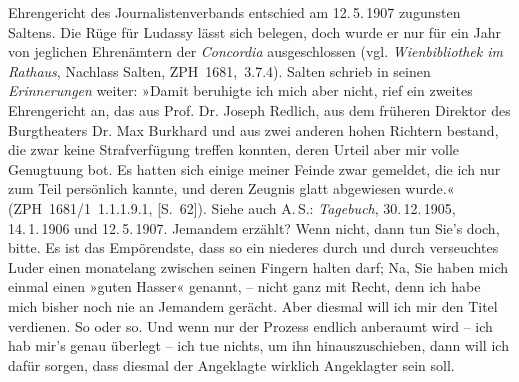 {{{                  Ehrengericht des Journalistenverbands entschied am 12. 5. 1907 zugunsten Saltens. Die Rüge für Ludassy lässt sich belegen, doch wurde er nur für ein Jahr von jeglichen
                  Ehrenämtern der \emph{Concordia} ausgeschlossen
                     (vgl. \emph{Wienbibliothek im Rathaus}, Nachlass Salten, ZPH 1681, 3.7.4). Salten schrieb in seinen \emph{Erinnerungen} weiter: »Damit beruhigte ich mich
                     aber nicht, rief ein zweites Ehrengericht an, das aus Prof. Dr. Joseph Redlich, aus dem früheren Direktor
                     des Burgtheaters Dr. Max Burkhard und aus zwei anderen hohen Richtern
                     bestand, die zwar keine Strafverfügung treffen konnten, deren Urteil aber mir
                     volle Genugtuung bot. Es hatten sich einige meiner Feinde zwar gemeldet, die
                     ich nur zum Teil persönlich kannte, und deren Zeugnis glatt abgewiesen
                     wurde.« (ZPH 1681/1 1.1.1.9.1, [S. 62]). Siehe auch A. S.: \emph{Tagebuch}, 30. 12. 1905, 14. 1. 1906 und 12. 5. 1907.}}}\label{K_L03415-6}
               Jemandem erzählt? Wenn nicht, dann tun Sie’s doch, bitte. Es ist das Empörendste,
               dass so ein niederes {\pb}durch und
               durch verseuchtes Luder einen monatelang zwischen seinen Fingern halten darf; Na, Sie
               haben mich einmal einen »guten Hasser« genannt, – nicht ganz mit Recht, denn ich habe
               mich bisher noch nie an Jemandem gerächt. Aber diesmal will ich mir den Titel
               verdienen. So oder so. Und wenn nur der Prozess endlich anberaumt wird – ich hab
               mir’s genau überlegt – ich tue nichts, um ihn hinauszuschieben, dann will ich dafür
               sorgen, dass diesmal der Angeklagte wirklich Angeklagter sein soll.\pend
           
